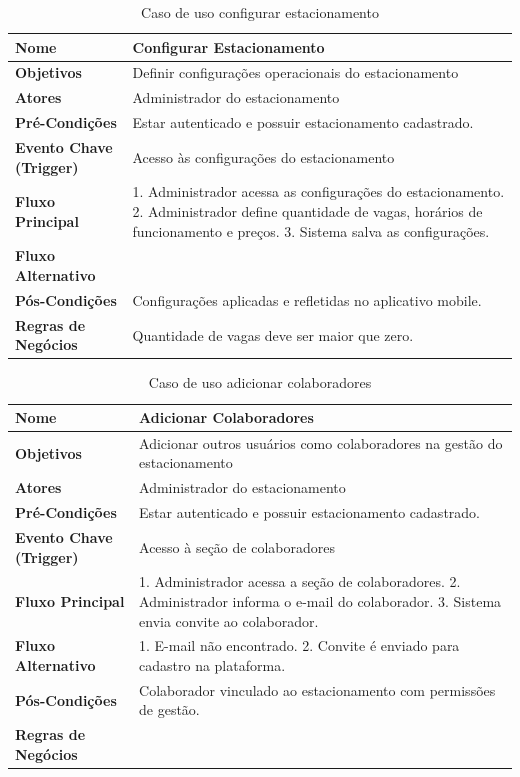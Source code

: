 \begin{table}[H]
\begin{center}
\caption{Caso de uso configurar estacionamento}
\label{tab:caso-uso-configurar-estacionamento}
\begin{tabular}{|p{4cm}|p{9cm}|}
\hline
\textbf{Nome} & Configurar Estacionamento \\
\hline
\textbf{Objetivos} & Definir configurações operacionais do estacionamento \\
\hline
\textbf{Atores} & Administrador do estacionamento \\
\hline
\textbf{Pré-Condições} & Estar autenticado e possuir estacionamento cadastrado. \\
\hline
\textbf{Evento Chave (Trigger)} & Acesso às configurações do estacionamento \\
\hline
\textbf{Fluxo Principal} & 1. Administrador acessa as configurações do estacionamento. 2. Administrador define quantidade de vagas, horários de funcionamento e preços. 3. Sistema salva as configurações. \\
\hline
\textbf{Fluxo Alternativo} & \\
\hline
\textbf{Pós-Condições} & Configurações aplicadas e refletidas no aplicativo mobile. \\
\hline
\textbf{Regras de Negócios} & Quantidade de vagas deve ser maior que zero. \\
\hline
\end{tabular}
\end{center}
\end{table}

\begin{table}[H]
\begin{center}
\caption{Caso de uso adicionar colaboradores}
\label{tab:caso-uso-adicionar-colaboradores}
\begin{tabular}{|p{4cm}|p{9cm}|}
\hline
\textbf{Nome} & Adicionar Colaboradores \\
\hline
\textbf{Objetivos} & Adicionar outros usuários como colaboradores na gestão do estacionamento \\
\hline
\textbf{Atores} & Administrador do estacionamento \\
\hline
\textbf{Pré-Condições} & Estar autenticado e possuir estacionamento cadastrado. \\
\hline
\textbf{Evento Chave (Trigger)} & Acesso à seção de colaboradores \\
\hline
\textbf{Fluxo Principal} & 1. Administrador acessa a seção de colaboradores. 2. Administrador informa o e-mail do colaborador. 3. Sistema envia convite ao colaborador. \\
\hline
\textbf{Fluxo Alternativo} & 1. E-mail não encontrado. 2. Convite é enviado para cadastro na plataforma. \\
\hline
\textbf{Pós-Condições} & Colaborador vinculado ao estacionamento com permissões de gestão. \\
\hline
\textbf{Regras de Negócios} & \\
\hline
\end{tabular}
\end{center}
\end{table}

